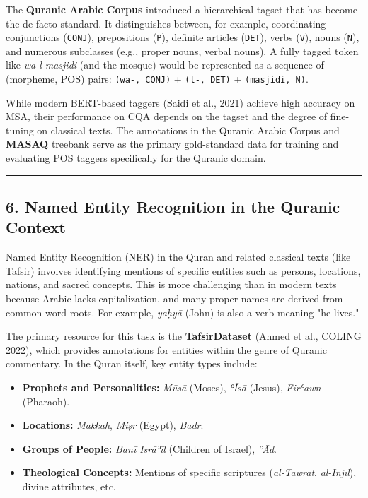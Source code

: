 \documentclass[12pt,a4paper]{article}
\providecommand{\tightlist}{\setlength{\itemsep}{0pt}\setlength{\parskip}{0pt}}
\begin{document}
The \textbf{Quranic Arabic Corpus} introduced a hierarchical tagset that
has become the de facto standard. It distinguishes between, for example,
coordinating conjunctions (\texttt{CONJ}), prepositions (\texttt{P}),
definite articles (\texttt{DET}), verbs (\texttt{V}), nouns
(\texttt{N}), and numerous subclasses (e.g., proper nouns, verbal
nouns). A fully tagged token like \emph{wa-l-masjidi} (and the mosque)
would be represented as a sequence of (morpheme, POS) pairs:
\texttt{(wa-,\ CONJ)} + \texttt{(l-,\ DET)} + \texttt{(masjidi,\ N)}.

While modern BERT-based taggers (Saidi et al., 2021) achieve high
accuracy on MSA, their performance on CQA depends on the tagset and the
degree of fine-tuning on classical texts. The annotations in the Quranic
Arabic Corpus and \textbf{MASAQ} treebank serve as the primary
gold-standard data for training and evaluating POS taggers specifically
for the Quranic domain.

\begin{center}\rule{0.5\linewidth}{0.5pt}\end{center}

\protect{}\label{s6}
\subsection{6. Named Entity Recognition in the Quranic
Context}\label{named-entity-recognition-in-the-quranic-context}

Named Entity Recognition (NER) in the Quran and related classical texts
(like Tafsir) involves identifying mentions of specific entities such as
persons, locations, nations, and sacred concepts. This is more
challenging than in modern texts because Arabic lacks capitalization,
and many proper names are derived from common word roots. For example,
\emph{yaḥyā} (John) is also a verb meaning "he lives."

The primary resource for this task is the \textbf{TafsirDataset} (Ahmed
et al., COLING 2022), which provides annotations for entities within the
genre of Quranic commentary. In the Quran itself, key entity types
include:

\begin{itemize}
\tightlist
\item
  \textbf{Prophets and Personalities:} \emph{Mūsā} (Moses), \emph{ʿĪsā}
  (Jesus), \emph{Firʿawn} (Pharaoh).
\item
  \textbf{Locations:} \emph{Makkah}, \emph{Miṣr} (Egypt), \emph{Badr}.
\item
  \textbf{Groups of People:} \emph{Banī Isrāʾīl} (Children of Israel),
  \emph{ʿĀd}.
\item
  \textbf{Theological Concepts:} Mentions of specific scriptures
  (\emph{al-Tawrāt}, \emph{al-Injīl}), divine attributes, etc.
\end{itemize}
\end{document}
